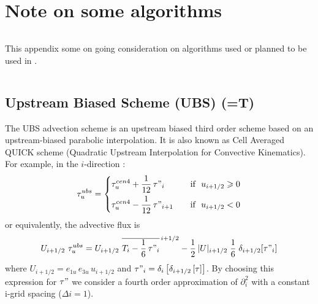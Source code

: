 \documentclass[NEMO_book]{subfiles}
\begin{document}
\chapter{Note on some algorithms}
\label{Apdx_E}
\minitoc

\newpage
$\ $\newline    %
 
 This appendix some on going consideration on algorithms used or planned to be used
in \NEMO. 

$\ $\newline    %

\section{Upstream Biased Scheme (UBS) (=T)}
\label{TRA_adv_ubs}

The UBS advection scheme is an upstream biased third order scheme based on 
an upstream-biased parabolic interpolation. It is also known as Cell Averaged 
QUICK scheme (Quadratic Upstream Interpolation for Convective 
Kinematics). For example, in the $i$-direction :
\begin{equation} \label{Eq_tra_adv_ubs2}
\tau _u^{ubs} = \left\{	 \begin{aligned}
  & \tau _u^{cen4} + \frac{1}{12} \,\tau"_i	   & \quad \text{if }\ u_{i+1/2} \geqslant 0 \\
  & \tau _u^{cen4} - \frac{1}{12} \,\tau"_{i+1} & \quad \text{if }\ u_{i+1/2}       <       0
  						 \end{aligned}    \right.
\end{equation}
or equivalently, the advective flux is
\begin{equation} \label{Eq_tra_adv_ubs2}
U_{i+1/2} \ \tau _u^{ubs} 
=U_{i+1/2} \ \overline{ T_i - \frac{1}{6}\,\tau"_i }^{\,i+1/2}
- \frac{1}{2}\, |U|_{i+1/2} \;\frac{1}{6} \;\delta_{i+1/2}[\tau"_i]
\end{equation}
where $U_{i+1/2} = e_{1u}\,e_{3u}\,u_{i+1/2}$ and 
$\tau "_i =\delta _i \left[ {\delta _{i+1/2} \left[ \tau \right]} \right]$. 
By choosing this expression for $\tau "$ we consider a fourth order approximation 
of $\partial_i^2$ with a constant i-grid spacing ($\Delta i=1$). 
\end{document}
